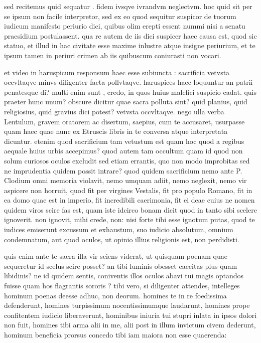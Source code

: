  sed recitemus quid sequatur . fidem ivsqve ivrandvm neglectvm. hoc quid sit per se ipsum non facile interpretor, sed ex eo quod sequitur suspicor de tuorum iudicum manifesto periurio dici, quibus olim erepti essent nummi nisi a senatu praesidium postulassent. qua re autem de iis dici suspicer haec causa est, quod sic statuo, et illud in hac civitate esse maxime inlustre atque insigne periurium, et te ipsum tamen in periuri crimen ab iis quibuscum coniurasti non vocari.

 et video in haruspicum responsum haec esse subiuncta : sacrificia vetvsta occvltaqve minvs diligenter facta pollvtaqve. haruspices haec loquuntur an patrii penatesque di? multi enim sunt , credo, in quos huius malefici suspicio cadat. quis praeter hunc unum? obscure dicitur quae sacra polluta sint? quid planius, quid religiosius, quid gravius dici potest? vetvsta occvltaqve. nego ulla verba Lentulum, gravem oratorem ac disertum, saepius, cum te accusaret, usurpasse quam haec quae nunc ex Etruscis libris in te conversa atque interpretata dicuntur. etenim quod sacrificium tam vetustum est quam hoc quod a regibus aequale huius urbis accepimus? quod autem tam occultum quam id quod non solum curiosos oculos excludit sed etiam errantis, quo non modo improbitas sed ne imprudentia quidem possit intrare? quod quidem sacrificium nemo ante P. Clodium omni memoria violavit, nemo umquam adiit, nemo neglexit, nemo vir aspicere non horruit, quod fit per virgines Vestalis, fit pro populo Romano, fit in ea domo quae est in imperio, fit incredibili caerimonia, fit ei deae cuius ne nomen quidem viros scire fas est, quam iste idcirco bonam dicit quod in tanto sibi scelere ignoverit. non ignovit, mihi crede, non: nisi forte tibi esse ignotum putas, quod te iudices emiserunt excussum et exhaustum, suo iudicio absolutum, omnium condemnatum, aut quod oculos, ut opinio illius religionis est, non perdidisti.

 quis enim ante te sacra illa vir sciens viderat, ut quisquam poenam quae sequeretur id scelus scire posset? an tibi luminis obesset caecitas plus quam libidinis? ne id quidem sentis, coniventis illos oculos abavi tui magis optandos fuisse quam hos flagrantis sororis ? tibi vero, si diligenter attendes, intelleges hominum poenas deesse adhuc, non deorum. homines te in re foedissima defenderunt, homines turpissimum nocentissimumque laudarunt, homines prope confitentem iudicio liberaverunt, hominibus iniuria tui stupri inlata in ipsos dolori non fuit, homines tibi arma alii in me, alii post in illum invictum civem dederunt, hominum beneficia prorsus concedo tibi iam maiora non esse quaerenda:

